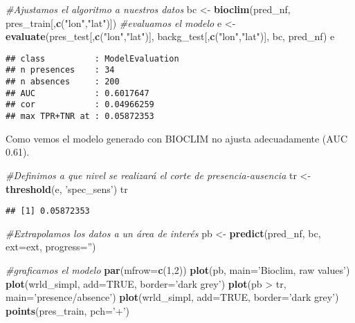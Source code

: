 \documentclass[]{article}
\newenvironment{Shaded}{\begin{snugshade}}{\end{snugshade}}
\newcommand{\KeywordTok}[1]{\textcolor[rgb]{0.13,0.29,0.53}{\textbf{{#1}}}}
\newcommand{\DataTypeTok}[1]{\textcolor[rgb]{0.13,0.29,0.53}{{#1}}}
\newcommand{\DecValTok}[1]{\textcolor[rgb]{0.00,0.00,0.81}{{#1}}}
\newcommand{\StringTok}[1]{\textcolor[rgb]{0.31,0.60,0.02}{{#1}}}
\newcommand{\CommentTok}[1]{\textcolor[rgb]{0.56,0.35,0.01}{\textit{{#1}}}}
\newcommand{\OtherTok}[1]{\textcolor[rgb]{0.56,0.35,0.01}{{#1}}}
\newcommand{\NormalTok}[1]{{#1}}
\begin{document}
\begin{Shaded}
\begin{Highlighting}[]
\CommentTok{#Ajustamos el algoritmo a nuestros datos}
\NormalTok{bc <-}\StringTok{ }\KeywordTok{bioclim}\NormalTok{(pred_nf, pres_train[,}\KeywordTok{c}\NormalTok{(}\StringTok{"lon"}\NormalTok{,}\StringTok{"lat"}\NormalTok{)])}
\CommentTok{#evaluamos el modelo}
\NormalTok{e <-}\StringTok{ }\KeywordTok{evaluate}\NormalTok{(pres_test[,}\KeywordTok{c}\NormalTok{(}\StringTok{"lon"}\NormalTok{,}\StringTok{"lat"}\NormalTok{)], backg_test[,}\KeywordTok{c}\NormalTok{(}\StringTok{"lon"}\NormalTok{,}\StringTok{"lat"}\NormalTok{)], bc, pred_nf)}
\NormalTok{e}
\end{Highlighting}
\end{Shaded}

\begin{verbatim}
## class          : ModelEvaluation 
## n presences    : 34 
## n absences     : 200 
## AUC            : 0.6017647 
## cor            : 0.04966259 
## max TPR+TNR at : 0.05872353
\end{verbatim}

Como vemos el modelo generado con BIOCLIM no ajusta adecuadamente (AUC
0.61).

\begin{Shaded}
\begin{Highlighting}[]
\CommentTok{#Definimos a que nivel se realizará el corte de presencia-ausencia }
\NormalTok{tr <-}\StringTok{ }\KeywordTok{threshold}\NormalTok{(e, }\StringTok{'spec_sens'}\NormalTok{)}
\NormalTok{tr}
\end{Highlighting}
\end{Shaded}

\begin{verbatim}
## [1] 0.05872353
\end{verbatim}

\begin{Shaded}
\begin{Highlighting}[]
\CommentTok{#Extrapolamos los datos a un área de interés}
\NormalTok{pb <-}\StringTok{ }\KeywordTok{predict}\NormalTok{(pred_nf, bc, }\DataTypeTok{ext=}\NormalTok{ext, }\DataTypeTok{progress=}\StringTok{''}\NormalTok{)}

\CommentTok{#graficamos el modelo}
\KeywordTok{par}\NormalTok{(}\DataTypeTok{mfrow=}\KeywordTok{c}\NormalTok{(}\DecValTok{1}\NormalTok{,}\DecValTok{2}\NormalTok{))}
\KeywordTok{plot}\NormalTok{(pb, }\DataTypeTok{main=}\StringTok{'Bioclim, raw values'}\NormalTok{)}
\KeywordTok{plot}\NormalTok{(wrld_simpl, }\DataTypeTok{add=}\OtherTok{TRUE}\NormalTok{, }\DataTypeTok{border=}\StringTok{'dark grey'}\NormalTok{)}
\KeywordTok{plot}\NormalTok{(pb >}\StringTok{ }\NormalTok{tr, }\DataTypeTok{main=}\StringTok{'presence/absence'}\NormalTok{)}
\KeywordTok{plot}\NormalTok{(wrld_simpl, }\DataTypeTok{add=}\OtherTok{TRUE}\NormalTok{, }\DataTypeTok{border=}\StringTok{'dark grey'}\NormalTok{)}
\KeywordTok{points}\NormalTok{(pres_train, }\DataTypeTok{pch=}\StringTok{'+'}\NormalTok{) }
\end{Highlighting}
\end{Shaded}
\end{document}

